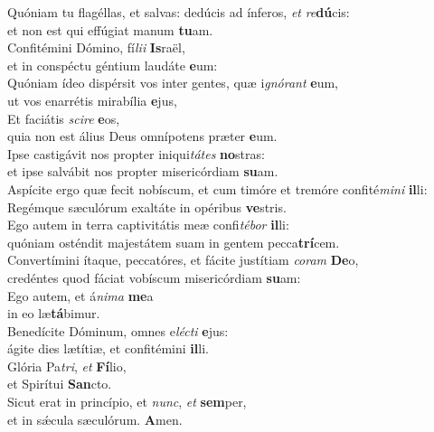 \evenverse Quóniam tu flagéllas, et salvas: dedúcis ad ínferos, \textit{et} \textit{re}\textbf{dú}cis:~\*\\
\evenverse et non est qui effúgiat manum \textbf{tu}am.\\
\oddverse Confitémini Dómino, fí\textit{li}\textit{i} \textbf{Is}raël,~\*\\
\oddverse et in conspéctu géntium laudáte \textbf{e}um:\\
\evenverse Quóniam ídeo dispérsit vos inter gentes, quæ i\textit{gnó}\textit{rant} \textbf{e}um,~\*\\
\evenverse ut vos enarrétis mirabília \textbf{e}jus,\\
\oddverse Et faciátis \textit{sci}\textit{re} \textbf{e}os,~\*\\
\oddverse quia non est álius Deus omnípotens præter \textbf{e}um.\\
\evenverse Ipse castigávit nos propter iniqui\textit{tá}\textit{tes} \textbf{no}stras:~\*\\
\evenverse et ipse salvábit nos propter misericórdiam \textbf{su}am.\\
\oddverse Aspícite ergo quæ fecit nobíscum, et cum timóre et tremóre confité\textit{mi}\textit{ni} \textbf{il}li:~\*\\
\oddverse Regémque sæculórum exaltáte in opéribus \textbf{ve}stris.\\
\evenverse Ego autem in terra captivitátis meæ confi\textit{té}\textit{bor} \textbf{il}li:~\*\\
\evenverse quóniam osténdit majestátem suam in gentem pecca\textbf{trí}cem.\\
\oddverse Convertímini ítaque, peccatóres, et fácite justítiam \textit{co}\textit{ram} \textbf{De}o,~\*\\
\oddverse credéntes quod fáciat vobíscum misericórdiam \textbf{su}am:\\
\evenverse Ego autem, et á\textit{ni}\textit{ma} \textbf{me}a~\*\\
\evenverse in eo læ\textbf{tá}bimur.\\
\oddverse Benedícite Dóminum, omnes e\textit{lé}\textit{cti} \textbf{e}jus:~\*\\
\oddverse ágite dies lætítiæ, et confitémini \textbf{il}li.\\
\evenverse Glória Pa\textit{tri}, \textit{et} \textbf{Fí}lio,~\*\\
\evenverse et Spirítui \textbf{San}cto.\\
\oddverse Sicut erat in princípio, et \textit{nunc}, \textit{et} \textbf{sem}per,~\*\\
\oddverse et in sǽcula sæculórum. \textbf{A}men.\\
